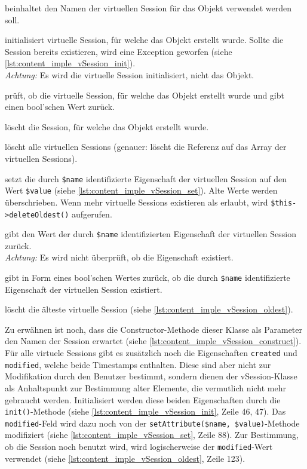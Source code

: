 \begin{description}[style=nextline]
	\item[\texttt{private \$name}] beinhaltet den Namen der virtuellen Session für das Objekt verwendet werden soll.
	\item[\texttt{public function init()}] initialisiert virtuelle Session, für welche das Objekt erstellt wurde. Sollte die Session bereits existieren, wird eine Exception geworfen (siehe \autoref{lst:content_imple_vSession_init}).\\
		\textit{Achtung:} Es wird die virtuelle Session initialisiert, nicht das Objekt.
	\item[\texttt{public function exists()}] prüft, ob die virtuelle Session, für welche das Objekt erstellt wurde und gibt einen bool'schen Wert zurück.
	\item[\texttt{public function destroy()}] löscht die Session, für welche das Objekt erstellt wurde.
	\item[\texttt{public function destroyAll()}] löscht alle virtuellen Sessions (genauer: löscht die Referenz auf das Array der virtuellen Sessions).
	\item[\texttt{public function setAttribute(\$name, \$value)}] setzt die durch \texttt{\$name} identifizierte Eigenschaft der virtuellen Session auf den Wert \texttt{\$value} (siehe \autoref{lst:content_imple_vSession_set}). Alte Werte werden überschrieben. Wenn mehr virtuelle Sessions existieren als erlaubt, wird \texttt{\$this->deleteOldest()} aufgerufen.
	\item[\texttt{public function getAttribute(\$name)}] gibt den Wert der durch \texttt{\$name} identifizierten Eigenschaft der virtuellen Session zurück.\\
		\textit{Achtung:} Es wird nicht überprüft, ob die Eigenschaft existiert.
	\item[\texttt{public function attributeIsset(\$name)}] gibt in Form eines bool'schen Wertes zurück, ob die durch \texttt{\$name} identifizierte Eigenschaft der virtuellen Session existiert.
	\item[\texttt{public function deleteOldest()}] löscht die älteste virtuelle Session (siehe \autoref{lst:content_imple_vSession_oldest}).
\end{description}
Zu erwähnen ist noch, dass die Constructor-Methode dieser Klasse als Parameter den Namen der Session erwartet (siehe \autoref{lst:content_imple_vSession_construct}).\\
Für alle virtuele Sessions gibt es zusätzlich noch die Eigenschaften \texttt{created} und \texttt{modified}, welche beide Timestamps enthalten. Diese sind aber nicht zur Modifikation durch den Benutzer bestimmt, sondern dienen der vSession-Klasse als Anhaltspunkt zur Bestimmung alter Elemente, die vermutlich nicht mehr gebraucht werden. Initialisiert werden diese beiden Eigenschaften durch die \texttt{init()}-Methode (siehe \autoref{lst:content_imple_vSession_init}, Zeile 46, 47). Das \texttt{modified}-Feld wird dazu noch von der \texttt{setAttribute(\$name, \$value)}-Methode modifiziert (siehe \autoref{lst:content_imple_vSession_set}, Zeile 88). Zur Bestimmung, ob die Session noch benutzt wird, wird logischerweise der \texttt{modified}-Wert verwendet (siehe \autoref{lst:content_imple_vSession_oldest}, Zeile 123).\\
